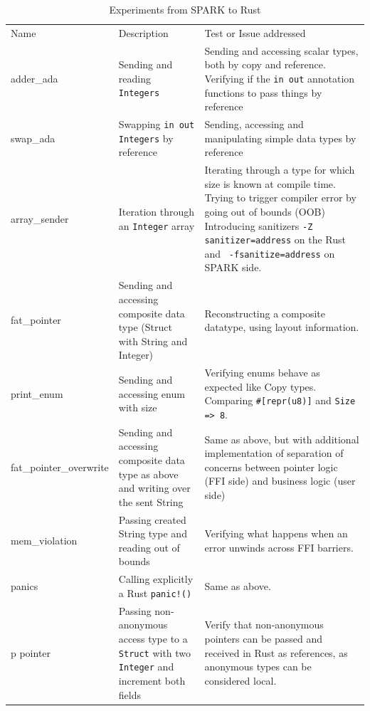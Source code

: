 \documentclass[nomenclature, english, bibtex]{kththesis}
\begin{document}
\begin{table}[ht!]
\footnotesize
\centering
\caption{Experiments from SPARK to Rust}
\label{tab:fromsparktorust}
\begin{tabular}{ |p{3cm}|p{4cm}|p{7cm}| }
\hline
\rowcolor{color1bg_fill}
\multicolumn{3}{|c|}{\centering From SPARK to Rust} \\
\hline
\rowcolor{color1bg_fill}
\centering Name & \centering Description & \centering Test or Issue addressed \tabularnewline
\hline
adder\_ada & Sending and reading \texttt{Integers} & Sending and accessing scalar types, both by copy and reference. \newline Verifying if the \texttt{in out} annotation functions to pass things by reference \tabularnewline
\hline
swap\_ada & Swapping \texttt{in out Integers} by reference & Sending, accessing and manipulating simple data types by reference \tabularnewline
\hline
array\_sender & Iteration through an \texttt{Integer} array  & Iterating through a type for which size is known at compile time. \newline Trying to trigger compiler error by going out of bounds (OOB) \newline Introducing sanitizers \texttt{-Z sanitizer=address} on the Rust and \texttt{ -fsanitize=address} on SPARK side. \tabularnewline
\hline
fat\_pointer & Sending and accessing composite data type (Struct with String and Integer) & Reconstructing a composite datatype, using layout information. \tabularnewline
\hline
print\_enum & Sending and accessing enum with size & Verifying enums behave as expected like Copy types. \newline Comparing \texttt{\#[repr(u8)]} and \texttt{Size => 8}. \tabularnewline
\hline
fat\_pointer\_overwrite & Sending and accessing composite data type as above and writing over the sent String & Same as above, but with additional implementation of separation of concerns between pointer logic (FFI side) and business logic (user side) \tabularnewline
\hline
mem\_violation & Passing created String type and reading out of bounds & Verifying what happens when an error unwinds across FFI barriers. \tabularnewline
\hline
panics & Calling explicitly a Rust \texttt{panic!()} & Same as above. \tabularnewline
\hline
p pointer & Passing non-anonymous access type to a \texttt{Struct} with two \texttt{Integer} and increment both fields & Verify that non-anonymous pointers can be passed and received in Rust as references, as anonymous types can be considered local. \tabularnewline
\hline
\end{tabular}
\end{table}
\FloatBarrier
\end{document}
